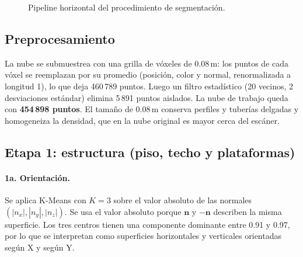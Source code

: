 \documentclass[11pt,a4paper]{article}
\begin{document}
\begin{figure}[H]
{%
}
\caption{Pipeline horizontal del procedimiento de segmentación.}
\label{fig:pipeline}
\end{figure}

\subsection{Preprocesamiento}

La nube se submuestrea con una grilla de vóxeles de 0.08\,m: los puntos de cada
vóxel se reemplazan por su promedio (posición, color y normal, renormalizada a
longitud 1), lo que deja 460\,789 puntos. Luego un filtro estadístico
(20 vecinos, 2 desviaciones estándar) elimina 5\,891 puntos aislados. La nube
de trabajo queda con \textbf{454\,898 puntos}. El tamaño de 0.08\,m conserva
perfiles y tuberías delgadas y homogeneiza la densidad, que en la nube original
es mayor cerca del escáner.

\subsection{Etapa 1: estructura (piso, techo y plataformas)}

\paragraph{1a. Orientación.} Se aplica K-Means con $K=3$ sobre el valor absoluto
de las normales $(|n_x|, |n_y|, |n_z|)$. Se usa el valor absoluto porque
$\mathbf{n}$ y $-\mathbf{n}$ describen la misma superficie. Los tres centros
tienen una componente dominante entre 0.91 y 0.97, por lo que se interpretan
como superficies horizontales y verticales orientadas según X y según Y.
\end{document}
